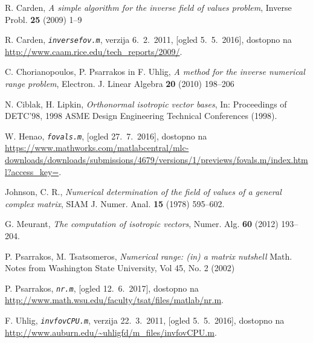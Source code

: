 \documentclass[12pt,a4paper]{amsart}
\theoremstyle{definition}
\theoremstyle{plain}
\begin{document}
\begin{thebibliography}{99}



R. Carden, \emph{A simple algorithm for the inverse field of values problem}, Inverse Probl. {\bf 25} (2009) 1--9

R. Carden, \emph{\texttt{inversefov.m}}, verzija 6.~2.~2011, [ogled 5.~5.~2016], dostopno na \url{http://www.caam.rice.edu/tech_reports/2009/}.

C. Chorianopoulos, P. Psarrakos in F. Uhlig, \emph{A method for the inverse numerical range problem}, Electron. J. Linear Algebra {\bf 20} (2010) 198--206

N. Ciblak, H. Lipkin, \emph{Orthonormal isotropic vector bases}, In: Proceedings of DETC'98, 1998 ASME Design Engineering Technical Conferences (1998).

W. Henao, \emph{\texttt{fovals.m}}, [ogled 27.~7.~2016], dostopno na \url{https://www.mathworks.com/matlabcentral/mlc-downloads/downloads/submissions/4679/versions/1/previews/fovals.m/index.html?access_key=}.

Johnson, C. R., \emph{Numerical determination of the field of values of a general complex matrix}, SIAM J. Numer. Anal. {\bf 15} (1978) 595--602.

G. Meurant, \emph{The computation of isotropic vectors}, Numer. Alg. {\bf 60} (2012) 193--204.

P. Psarrakos, M. Tsatsomeros, \emph{Numerical range: (in) a matrix nutshell} Math. Notes from Washington State University,  Vol 45, No. 2 (2002)

P. Psarrakos, \emph{\texttt{nr.m}}, [ogled 12.~6.~2017], dostopno na \url{http://www.math.wsu.edu/faculty/tsat/files/matlab/nr.m}.

F. Uhlig, \emph{\texttt{invfovCPU.m}}, verzija 22.~3.~2011, [ogled 5.~5.~2016], dostopno na \url{http://www.auburn.edu/~uhligfd/m_files/invfovCPU.m}.

\end{thebibliography}
\end{document}
